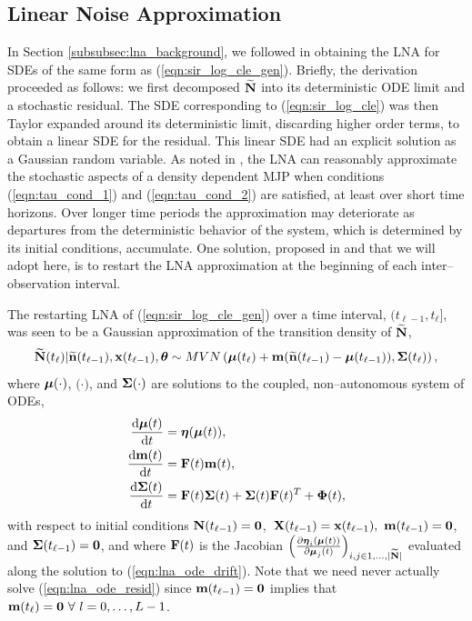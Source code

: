 \subsection{Linear Noise Approximation}
\label{subsec:sir_lna}

In Section \ref{subsubsec:lna_background}, we followed \cite{fearnhead2014,golightly2013simulation,golightly2015delayed} in obtaining the LNA for SDEs of the same form as (\ref{eqn:sir_log_cle_gen}). Briefly, the derivation proceeded as follows: we first decomposed $ \widetilde{\mathbf{N}} $ into its deterministic ODE limit and a stochastic residual. The SDE corresponding to (\ref{eqn:sir_log_cle}) was then Taylor expanded around its deterministic limit, discarding higher order terms, to obtain a linear SDE for the residual. This linear SDE had an explicit solution as a Gaussian random variable. As noted in \cite{wallace2012linear}, the LNA can reasonably approximate the stochastic aspects of a density dependent MJP when conditions (\ref{eqn:tau_cond_1}) and (\ref{eqn:tau_cond_2}) are satisfied, at least over short time horizons. Over longer time periods the approximation may deteriorate as departures from the deterministic behavior of the system, which is determined by its initial conditions, accumulate.  One solution, proposed in \cite{fearnhead2014} and that we will adopt here, is to restart the LNA approximation at the beginning of each inter--observation interval. 

The restarting LNA of (\ref{eqn:sir_log_cle_gen}) over a time interval, $ (t_{\ell-1},t_\ell] $, was seen to be a Gaussian approximation of the transition density of $ \widetilde{\mathbf{N}} $,
\begin{equation}
\label{eqn:lna_transition_density}
\widetilde{\mathbf{N}}(t_\ell)|\widetilde{\mathbf{n}}(t_{\ell-1}), \mathbf{x}(t_{\ell-1}),\boldsymbol{\theta} \sim MVN\left (\boldsymbol{\mu}(t_\ell) + \mathbf{m}(\widetilde{\mathbf{n}}(t_{\ell-1}) - \boldsymbol{\mu}(t_{\ell-1})), \boldsymbol{\Sigma}(t_\ell)\right ),
\end{equation}
where $ \boldsymbol{\mu}(\cdot) $, $ \bm(\cdot) $, and $ \boldsymbol{\Sigma}(\cdot) $ are solutions to the coupled, non--autonomous system of ODEs,
\begin{align}
\label{eqn:lna_ode_drift}
\frac{\mathrm{d}\boldsymbol{\mu}(t)}{\mathrm{d} t} &= \boldsymbol{\eta}(\boldsymbol{\mu}(t)),\\
\label{eqn:lna_ode_resid}
\frac{\mathrm{d}\mathbf{m}(t)}{\mathrm{d} t} &= \mathbf{F}(t)\mathbf{m}(t),\\
\label{eqn:lna_ode_diffusion}
\frac{\mathrm{d}\boldsymbol{\Sigma}(t)}{\mathrm{d} t} &= \mathbf{F}(t)\boldsymbol{\Sigma}(t) + \boldsymbol{\Sigma}(t)\mathbf{F}(t)^T + \boldsymbol{\Phi}(t),
\end{align}
with respect to initial conditions $ \mathbf{N}(t_{\ell-1}) = \boldsymbol{0} $,\ $ \mathbf{X}(t_{\ell-1}) = \mathbf{x}(t_{\ell-1}),\ \mathbf{m}(t_{\ell-1}) = \boldsymbol{0}$, and $ \boldsymbol{\Sigma}(t_{\ell-1}) = \boldsymbol{0} $, and where $ \mathbf{F}(t) $ is the Jacobian $ \left (\frac{\partial\boldsymbol{\eta}_i(\boldsymbol{\mu}(t))}{\partial\boldsymbol{\mu}_j(t)}\right )_{i,j\in{1,\dots,|\widetilde{\mathbf{N}}|}} $ evaluated along the solution to (\ref{eqn:lna_ode_drift}). Note that we need never actually solve (\ref{eqn:lna_ode_resid}) since $ \mathbf{m}(t_{\ell-1}) = \boldsymbol{0} $ implies that $ \bm(t_\ell) = \bs{0}\ \forall\ l=0,\dots,L-1$. 

